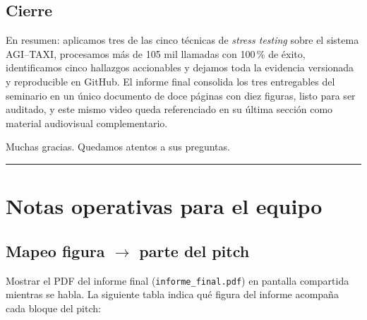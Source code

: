 \documentclass[11pt]{article}
\begin{document}
\subsection*{Cierre}

En resumen: aplicamos tres de las cinco t\'ecnicas de \textit{stress testing} sobre el sistema AGI--TAXI, procesamos m\'as de 105 mil llamadas con 100\,\% de \'exito, identificamos cinco hallazgos accionables y dejamos toda la evidencia versionada y reproducible en GitHub. El informe final consolida los tres entregables del seminario en un \'unico documento de doce p\'aginas con diez figuras, listo para ser auditado, y este mismo video queda referenciado en su \'ultima secci\'on como material audiovisual complementario.

\medskip
Muchas gracias. Quedamos atentos a sus preguntas.

\vspace{8pt}\hrule\vspace{8pt}

\section*{Notas operativas para el equipo}

\subsection*{Mapeo figura $\to$ parte del pitch}

Mostrar el PDF del informe final (\texttt{informe\_final.pdf}) en pantalla compartida mientras se habla. La siguiente tabla indica qu\'e figura del informe acompa\~na cada bloque del pitch:
\end{document}

